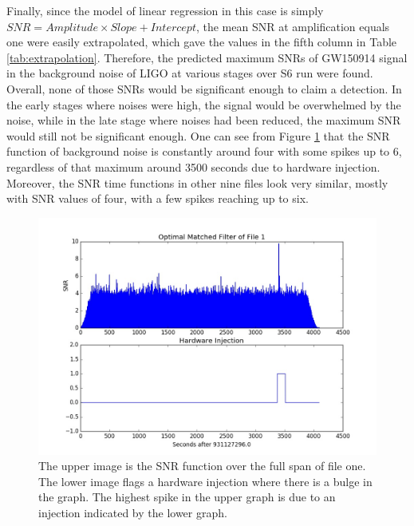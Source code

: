 \documentclass[aps,prd,preprint]{revtex4}
\begin{document}
\par Finally, since the model of linear regression in this case is simply $SNR=Amplitude\times Slope + Intercept$, the mean SNR at amplification equals one were easily extrapolated, which gave the values in the fifth column in Table \ref{tab:extrapolation}. Therefore, the predicted maximum SNRs of GW150914 signal in the background noise of LIGO at various stages over S6 run were found. Overall, none of those SNRs would be significant enough to claim a detection. In the early stages where noises were high, the signal would be overwhelmed by the noise, while in the late stage where noises had been reduced, the maximum SNR would still not be significant enough. One can see from Figure \ref{fig:file1} that the SNR function of background noise is constantly around four with some spikes up to 6, regardless of that maximum around 3500 seconds due to hardware injection. Moreover, the SNR time functions in other nine files look very similar, mostly with SNR values of four, with a few spikes reaching up to six.
\begin{figure}
	\includegraphics[scale = 0.35]{SNR}
	\caption{The upper image is the SNR function over the full span of file one. The lower image flags a hardware injection where there is a bulge in the graph. The highest spike in the upper graph is due to an injection indicated by the lower graph. \label{fig:file1}}
\end{figure}
\end{document}
